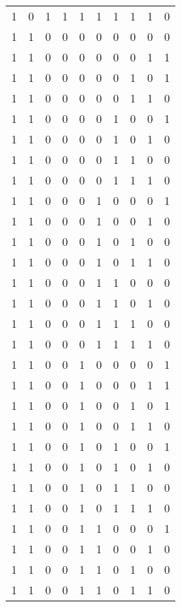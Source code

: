 \begin{longtable}[c]{rrrrrrrrrr}
        1 & 0 & 1 & 1 & 1 & 1 & 1 & 1 & 1 & 0 \\
        1 & 1 & 0 & 0 & 0 & 0 & 0 & 0 & 0 & 0 \\
        1 & 1 & 0 & 0 & 0 & 0 & 0 & 0 & 1 & 1 \\
        1 & 1 & 0 & 0 & 0 & 0 & 0 & 1 & 0 & 1 \\
        1 & 1 & 0 & 0 & 0 & 0 & 0 & 1 & 1 & 0 \\
        1 & 1 & 0 & 0 & 0 & 0 & 1 & 0 & 0 & 1 \\
        1 & 1 & 0 & 0 & 0 & 0 & 1 & 0 & 1 & 0 \\
        1 & 1 & 0 & 0 & 0 & 0 & 1 & 1 & 0 & 0 \\
        1 & 1 & 0 & 0 & 0 & 0 & 1 & 1 & 1 & 0 \\
        1 & 1 & 0 & 0 & 0 & 1 & 0 & 0 & 0 & 1 \\
        1 & 1 & 0 & 0 & 0 & 1 & 0 & 0 & 1 & 0 \\
        1 & 1 & 0 & 0 & 0 & 1 & 0 & 1 & 0 & 0 \\
        1 & 1 & 0 & 0 & 0 & 1 & 0 & 1 & 1 & 0 \\
        1 & 1 & 0 & 0 & 0 & 1 & 1 & 0 & 0 & 0 \\
        1 & 1 & 0 & 0 & 0 & 1 & 1 & 0 & 1 & 0 \\
        1 & 1 & 0 & 0 & 0 & 1 & 1 & 1 & 0 & 0 \\
        1 & 1 & 0 & 0 & 0 & 1 & 1 & 1 & 1 & 0 \\
        1 & 1 & 0 & 0 & 1 & 0 & 0 & 0 & 0 & 1 \\
        1 & 1 & 0 & 0 & 1 & 0 & 0 & 0 & 1 & 1 \\
        1 & 1 & 0 & 0 & 1 & 0 & 0 & 1 & 0 & 1 \\
        1 & 1 & 0 & 0 & 1 & 0 & 0 & 1 & 1 & 0 \\
        1 & 1 & 0 & 0 & 1 & 0 & 1 & 0 & 0 & 1 \\
        1 & 1 & 0 & 0 & 1 & 0 & 1 & 0 & 1 & 0 \\
        1 & 1 & 0 & 0 & 1 & 0 & 1 & 1 & 0 & 0 \\
        1 & 1 & 0 & 0 & 1 & 0 & 1 & 1 & 1 & 0 \\
        1 & 1 & 0 & 0 & 1 & 1 & 0 & 0 & 0 & 1 \\
        1 & 1 & 0 & 0 & 1 & 1 & 0 & 0 & 1 & 0 \\
        1 & 1 & 0 & 0 & 1 & 1 & 0 & 1 & 0 & 0 \\
        1 & 1 & 0 & 0 & 1 & 1 & 0 & 1 & 1 & 0 \\

\end{longtable}
